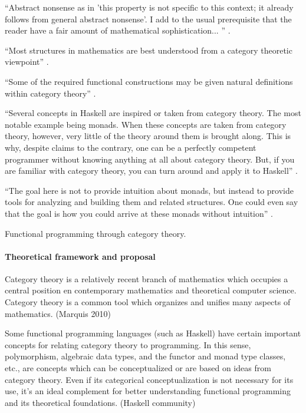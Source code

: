 ``Abstract nonsense as in 'this property is not specific to this
context; it already follows from general abstract nonsense'. I add to
the usual prerequisite that the reader have a fair amount of
mathematical sophistication... '' \parencite{nlab-category-theory}.

``Most structures in mathematics are best understood from a category
theoretic viewpoint'' \parencite{nlab-category-theory}.

``Some of the required functional constructions may be given natural
definitions within category theory'' \parencite[7]{pitt-1986}.

``Several concepts in Haskell are inspired or taken from category
theory. The most notable example being monads. When these concepts are
taken from category theory, however, very little of the theory around
them is brought along. This is why, despite claims to the contrary,
one can be a perfectly competent programmer without knowing anything
at all about category theory. But, if you are familiar with category
theory, you can turn around and apply it to Haskell''
\parencite[73]{elkins-2009}.

``The goal here is not to provide intuition about monads, but instead
to provide tools for analyzing and building them and related
structures. One could even say that the goal is how you could arrive
at these monads without intuition'' \parencite[73]{elkins-2009}.

\parencites{bird-demoor-1997}{goguen-1991}{marquis-2013}{pierce-1991}{poigne-1992}

Functional programming through category theory.

\paragraph{Theoretical framework and proposal}

Category theory is a relatively recent branch of mathematics which
occupies a central position en contemporary mathematics and
theoretical computer science. Category theory is a common tool which
organizes and unifies many aspects of mathematics. (Marquis 2010)

Some functional programming languages (such as Haskell) have certain
important concepts for relating category theory to programming. In
this sense, polymorphism, algebraic data types, and the functor and
monad type classes, etc., are concepts which can be conceptualized or
are based on ideas from category theory. Even if its categorical
conceptualization is not necessary for its use, it's an ideal
complement for better understanding functional programming and its
theoretical foundations. (Haskell community)

